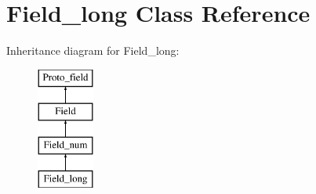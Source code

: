 \hypertarget{classField__long}{}\section{Field\+\_\+long Class Reference}
\label{classField__long}
Inheritance diagram for Field\+\_\+long\+:\begin{figure}[H]
\begin{center}
\leavevmode
\includegraphics[height=4.000000cm]{classField__long}
\end{center}
\end{figure}
